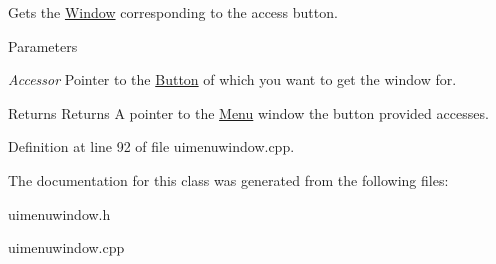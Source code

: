 Gets the \hyperlink{classphys_1_1UI_1_1Window}{Window} corresponding to the access button. 


\begin{DoxyParams}{Parameters}
\item[{\em Accessor}]Pointer to the \hyperlink{classphys_1_1UI_1_1Button}{Button} of which you want to get the window for. \end{DoxyParams}
\begin{DoxyReturn}{Returns}
Returns A pointer to the \hyperlink{classphys_1_1UI_1_1Menu}{Menu} window the button provided accesses. 
\end{DoxyReturn}


Definition at line 92 of file uimenuwindow.cpp.



The documentation for this class was generated from the following files:\begin{DoxyCompactItemize}
\item 
uimenuwindow.h\item 
uimenuwindow.cpp\end{DoxyCompactItemize}
